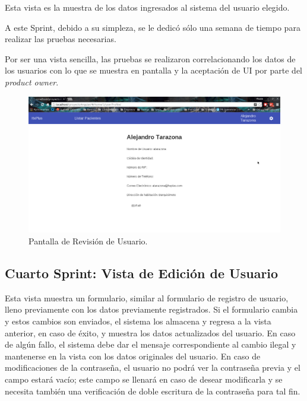     Esta vista es la muestra de los datos ingresados al sistema del usuario elegido.
    
    A este Sprint, debido a su simpleza, se le dedicó sólo una semana de tiempo para realizar las pruebas necesarias.
    
    Por ser una vista sencilla, las pruebas se realizaron correlacionando los datos de los usuarios con lo que se muestra en pantalla y la aceptación de UI por parte del \textit{product owner}.
    
    \begin{figure}[htbp!]
        \begin{center}
            \includegraphics[width=.9\textwidth]{figures/p3}
        \end{center}
        \caption{Pantalla de Revisión de Usuario.}
        \label{Revisión}
    \end{figure}
    
    \subsection{Cuarto Sprint: Vista de Edición de Usuario}
    
    Esta vista muestra un formulario, similar al formulario de registro de usuario, lleno previamente con los datos  previamente registrados. Si el formulario cambia y estos cambios son enviados, el sistema los almacena y regresa a la vista anterior, en caso de éxito, y muestra los datos actualizados del usuario. En caso de algún fallo, el sistema debe dar el mensaje correspondiente al cambio ilegal y mantenerse en la vista con los datos originales del usuario. En caso de modificaciones de la contraseña, el usuario no podrá ver la contraseña previa y el campo estará vacío; este campo se llenará en caso de desear modificarla y se necesita también una verificación de doble escritura de la contraseña para tal fin.
    
